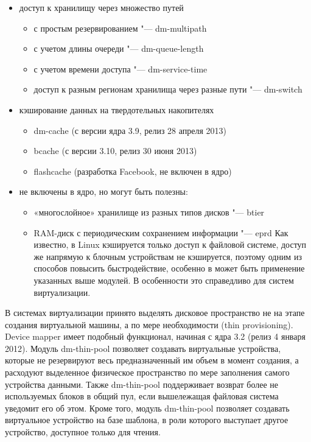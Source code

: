 \documentclass[10pt, a5paper]{article}
\begin{document}
\begin{itemize}
  \item доступ к хранилищу через множество путей\begin{itemize}
  \item с простым резервированием "--- dm-multipath
  \item с учетом длины очереди "--- dm-queue-length
  \item с учетом времени доступа "--- dm-service-time
  \item доступ к разным регионам хранилища через разные пути "--- dm-switch
\end{itemize}


  \item кэширование данных на твердотельных накопителях\begin{itemize}
  \item dm-cache (с версии ядра 3.9,  релиз 28 апреля 2013)
  \item bcache (с версии 3.10, релиз 30 июня 2013)
  \item flashcache (разработка Facebook, не включен в ядро)
\end{itemize}


  \item не включены в ядро, но могут быть полезны:\begin{itemize}
  \item «многослойное» хранилище из разных типов дисков "--- btier
  \item RAM-диск с периодическим сохранением информации "--- eprd
Как известно, в Linux кэшируется только доступ к файловой системе, доступ же напрямую к блочным устройствам не кэшируется, поэтому одним из способов повысить быстродействие, особенно в может быть применение указанных выше модулей. В особенности это справедливо для систем виртуализации.
\end{itemize}


\end{itemize}

В системах  виртуализации принято выделять дисковое пространство не на этапе создания виртуальной машины, а по мере необходимости (thin provisioning). Device mapper имеет подобный функционал, начиная с ядра 3.2 (релиз 4 января 2012). Модуль dm-thin-pool позволяет создавать виртуальные устройства, которые не резервируют весь предназначенный им объем в момент создания, а расходуют выделенное физическое пространство по мере заполнения самого устройства данными. Также dm-thin-pool поддерживает возврат более не используемых блоков в общий пул, если вышележащая файловая система уведомит его об этом. Кроме того, модуль dm-thin-pool  позволяет создавать виртуальное устройство на базе шаблона, в роли которого выступает другое устройство, доступное только для чтения.
\end{document}
